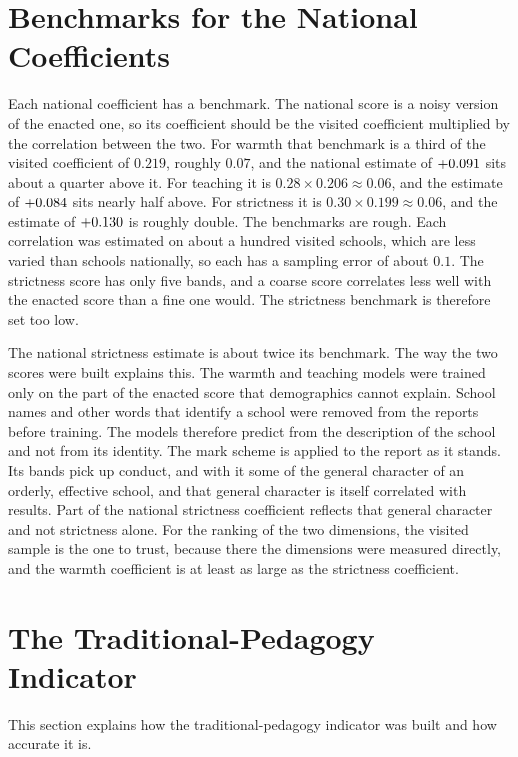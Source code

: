 \section{Benchmarks for the National Coefficients}
\label{app:3A:benchmarks}

Each national coefficient has a benchmark. The national score is a noisy version of the enacted one, so its coefficient should be the visited coefficient multiplied by the correlation between the two. For warmth that benchmark is a third of the visited coefficient of $0.219$, roughly $0.07$, and the national estimate of $+0.091$ sits about a quarter above it. For teaching it is $0.28 \times 0.206 \approx 0.06$, and the estimate of $+0.084$ sits nearly half above. For strictness it is $0.30 \times 0.199 \approx 0.06$, and the estimate of $+0.130$ is roughly double. The benchmarks are rough. Each correlation was estimated on about a hundred visited schools, which are less varied than schools nationally, so each has a sampling error of about $0.1$. The strictness score has only five bands, and a coarse score correlates less well with the enacted score than a fine one would. The strictness benchmark is therefore set too low.

The national strictness estimate is about twice its benchmark. The way the two scores were built explains this. The warmth and teaching models were trained only on the part of the enacted score that demographics cannot explain. School names and other words that identify a school were removed from the reports before training. The models therefore predict from the description of the school and not from its identity. The mark scheme is applied to the report as it stands. Its bands pick up conduct, and with it some of the general character of an orderly, effective school, and that general character is itself correlated with results. Part of the national strictness coefficient reflects that general character and not strictness alone. For the ranking of the two dimensions, the visited sample is the one to trust, because there the dimensions were measured directly, and the warmth coefficient is at least as large as the strictness coefficient.

\section{The Traditional-Pedagogy Indicator}
\label{app:3A:pedagogy}

This section explains how the traditional-pedagogy indicator was built and
how accurate it is.

